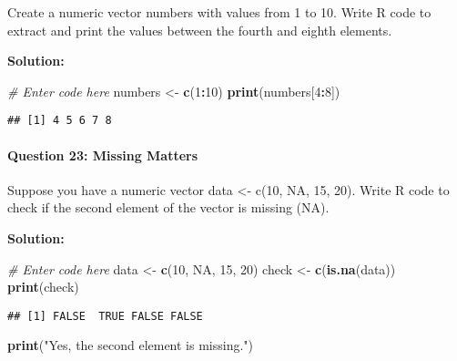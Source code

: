 \documentclass[
]{article}
\newenvironment{Shaded}{\begin{snugshade}}{\end{snugshade}}
\newcommand{\CommentTok}[1]{\textcolor[rgb]{0.56,0.35,0.01}{\textit{#1}}}
\newcommand{\ConstantTok}[1]{\textcolor[rgb]{0.56,0.35,0.01}{#1}}
\newcommand{\DecValTok}[1]{\textcolor[rgb]{0.00,0.00,0.81}{#1}}
\newcommand{\FunctionTok}[1]{\textcolor[rgb]{0.13,0.29,0.53}{\textbf{#1}}}
\newcommand{\NormalTok}[1]{#1}
\newcommand{\OtherTok}[1]{\textcolor[rgb]{0.56,0.35,0.01}{#1}}
\newcommand{\SpecialCharTok}[1]{\textcolor[rgb]{0.81,0.36,0.00}{\textbf{#1}}}
\newcommand{\StringTok}[1]{\textcolor[rgb]{0.31,0.60,0.02}{#1}}
\begin{document}
Create a numeric vector numbers with values from 1 to 10. Write R code
to extract and print the values between the fourth and eighth elements.

\textbf{Solution:}

\begin{Shaded}
\begin{Highlighting}[]
\CommentTok{\# Enter code here}
\NormalTok{numbers }\OtherTok{\textless{}{-}} \FunctionTok{c}\NormalTok{(}\DecValTok{1}\SpecialCharTok{:}\DecValTok{10}\NormalTok{)}
\FunctionTok{print}\NormalTok{(numbers[}\DecValTok{4}\SpecialCharTok{:}\DecValTok{8}\NormalTok{])}
\end{Highlighting}
\end{Shaded}

\begin{verbatim}
## [1] 4 5 6 7 8
\end{verbatim}

\hypertarget{question-23-missing-matters}{%
\paragraph{Question 23: Missing
Matters}\label{question-23-missing-matters}}

Suppose you have a numeric vector data \textless- c(10, NA, 15, 20).
Write R code to check if the second element of the vector is missing
(NA).

\textbf{Solution:}

\begin{Shaded}
\begin{Highlighting}[]
\CommentTok{\# Enter code here}
\NormalTok{data }\OtherTok{\textless{}{-}} \FunctionTok{c}\NormalTok{(}\DecValTok{10}\NormalTok{, }\ConstantTok{NA}\NormalTok{, }\DecValTok{15}\NormalTok{, }\DecValTok{20}\NormalTok{)}
\NormalTok{check }\OtherTok{\textless{}{-}} \FunctionTok{c}\NormalTok{(}\FunctionTok{is.na}\NormalTok{(data))}
\FunctionTok{print}\NormalTok{(check)}
\end{Highlighting}
\end{Shaded}

\begin{verbatim}
## [1] FALSE  TRUE FALSE FALSE
\end{verbatim}

\begin{Shaded}
\begin{Highlighting}[]
\FunctionTok{print}\NormalTok{(}\StringTok{"Yes, the second element is missing."}\NormalTok{)}
\end{Highlighting}
\end{Shaded}
\end{document}
